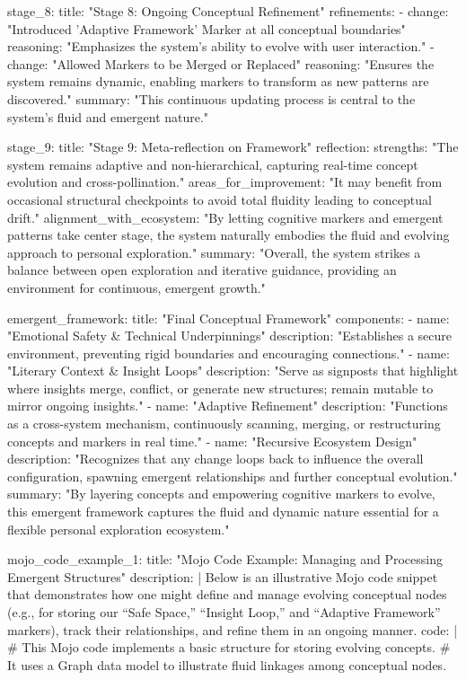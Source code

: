 {  stage_8:
    title: "Stage 8: Ongoing Conceptual Refinement"
    refinements:
      - change: "Introduced 'Adaptive Framework' Marker at all conceptual boundaries"
        reasoning: "Emphasizes the system's ability to evolve with user interaction."
      - change: "Allowed Markers to be Merged or Replaced"
        reasoning: "Ensures the system remains dynamic, enabling markers to transform as new patterns are discovered."
    summary: "This continuous updating process is central to the system's fluid and emergent nature."

  stage_9:
    title: "Stage 9: Meta-reflection on Framework"
    reflection:
      strengths: "The system remains adaptive and non-hierarchical, capturing real-time concept evolution and cross-pollination."
      areas_for_improvement: "It may benefit from occasional structural checkpoints to avoid total fluidity leading to conceptual drift."
      alignment_with_ecosystem: "By letting cognitive markers and emergent patterns take center stage, the system naturally embodies the fluid and evolving approach to personal exploration."
    summary: "Overall, the system strikes a balance between open exploration and iterative guidance, providing an environment for continuous, emergent growth."

emergent_framework:
  title: "Final Conceptual Framework"
  components:
    - name: "Emotional Safety & Technical Underpinnings"
      description: "Establishes a secure environment, preventing rigid boundaries and encouraging connections."
    - name: "Literary Context & Insight Loops"
      description: "Serve as signposts that highlight where insights merge, conflict, or generate new structures; remain mutable to mirror ongoing insights."
    - name: "Adaptive Refinement"
      description: "Functions as a cross-system mechanism, continuously scanning, merging, or restructuring concepts and markers in real time."
    - name: "Recursive Ecosystem Design"
      description: "Recognizes that any change loops back to influence the overall configuration, spawning emergent relationships and further conceptual evolution."
  summary: "By layering concepts and empowering cognitive markers to evolve, this emergent framework captures the fluid and dynamic nature essential for a flexible personal exploration ecosystem."

mojo_code_example_1:
  title: "Mojo Code Example: Managing and Processing Emergent Structures"
  description: |
    Below is an illustrative Mojo code snippet that demonstrates how one might define and manage evolving conceptual nodes (e.g., for storing our “Safe Space,” “Insight Loop,” and “Adaptive Framework” markers), track their relationships, and refine them in an ongoing manner.
  code: |
    # This Mojo code implements a basic structure for storing evolving concepts.
    # It uses a Graph data model to illustrate fluid linkages among conceptual nodes.

}
